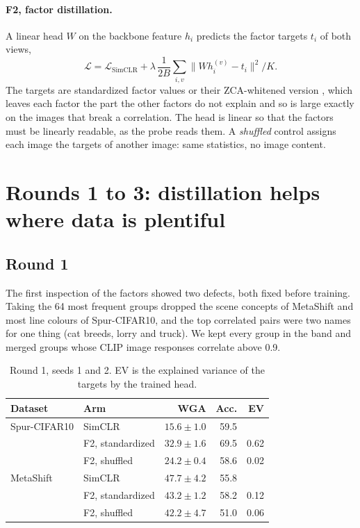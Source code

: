 \documentclass{article}
\begin{document}
\paragraph{F2, factor distillation.} A linear head $W$ on the backbone feature $h_i$ predicts the
factor targets $t_i$ of both views,
\begin{equation}
\mathcal{L}=\mathcal{L}_{\mathrm{SimCLR}}+\lambda\,\frac{1}{2B}\sum_{i,v}\lVert W h_i^{(v)}-t_i\rVert^2/K .
\end{equation}
The targets are standardized factor values or their ZCA-whitened version \citep{kessy2018whitening},
which leaves each factor the part the other factors do not explain and so is large exactly on the
images that break a correlation. The head is linear so that the factors must be linearly readable, as
the probe reads them. A \emph{shuffled} control assigns each image the targets of another image: same
statistics, no image content.

\section{Rounds 1 to 3: distillation helps where data is plentiful}
\label{sec:rounds}

\subsection{Round 1}
The first inspection of the factors showed two defects, both fixed before training. Taking the 64 most
frequent groups dropped the scene concepts of MetaShift and most line colours of Spur-CIFAR10, and the
top correlated pairs were two names for one thing (cat breeds, lorry and truck). We kept every group in
the band and merged groups whose CLIP image responses correlate above 0.9.

\begin{table}[h]
\centering
\caption{Round 1, seeds 1 and 2. EV is the explained variance of the targets by the trained head.}
\label{tab:round1}
\small
\begin{tabular}{l l r r r}
\toprule
Dataset & Arm & WGA & Acc. & EV \\
\midrule
Spur-CIFAR10 & SimCLR & $15.6\pm1.0$ & 59.5 & \\
 & F2, standardized & $32.9\pm1.6$ & 69.5 & 0.62 \\
 & F2, shuffled & $24.2\pm0.4$ & 58.6 & 0.02 \\
\midrule
MetaShift & SimCLR & $47.7\pm4.2$ & 55.8 & \\
 & F2, standardized & $43.2\pm1.2$ & 58.2 & 0.12 \\
 & F2, shuffled & $42.2\pm4.7$ & 51.0 & 0.06 \\
\bottomrule
\end{tabular}
\end{table}
\end{document}
